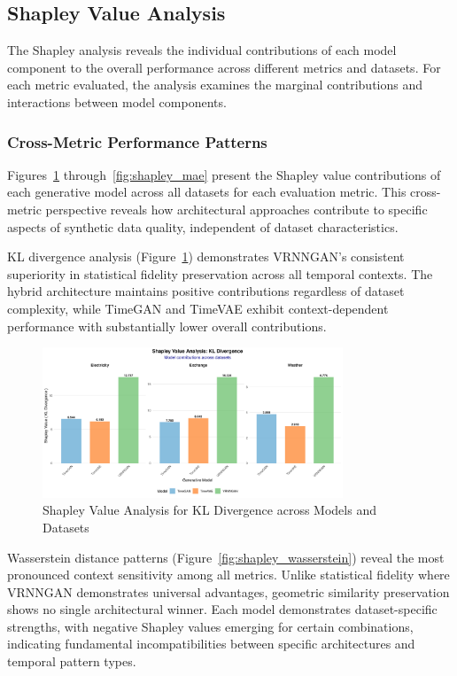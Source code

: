 \documentclass[11pt]{article}
\begin{document}
\subsection{Shapley Value Analysis}
The Shapley analysis reveals the individual contributions of each model component to the overall performance across different metrics and datasets. For each metric evaluated, the analysis examines the marginal contributions and interactions between model components.

\subsubsection{Cross-Metric Performance Patterns}

Figures~\ref{fig:shapley_kl} through~\ref{fig:shapley_mae} present the Shapley value contributions of each generative model across all datasets for each evaluation metric. This cross-metric perspective reveals how architectural approaches contribute to specific aspects of synthetic data quality, independent of dataset characteristics.

KL divergence analysis (Figure~\ref{fig:shapley_kl}) demonstrates VRNNGAN's consistent superiority in statistical fidelity preservation across all temporal contexts. The hybrid architecture maintains positive contributions regardless of dataset complexity, while TimeGAN and TimeVAE exhibit context-dependent performance with substantially lower overall contributions.

\begin{figure}[H]
\centering
\includegraphics[width=0.8\textwidth]{assets/shapley_kl_analysis.png}
\caption{Shapley Value Analysis for KL Divergence across Models and Datasets}
\label{fig:shapley_kl}
\end{figure}

Wasserstein distance patterns (Figure~\ref{fig:shapley_wasserstein}) reveal the most pronounced context sensitivity among all metrics. Unlike statistical fidelity where VRNNGAN demonstrates universal advantages, geometric similarity preservation shows no single architectural winner. Each model demonstrates dataset-specific strengths, with negative Shapley values emerging for certain combinations, indicating fundamental incompatibilities between specific architectures and temporal pattern types.
\end{document}
